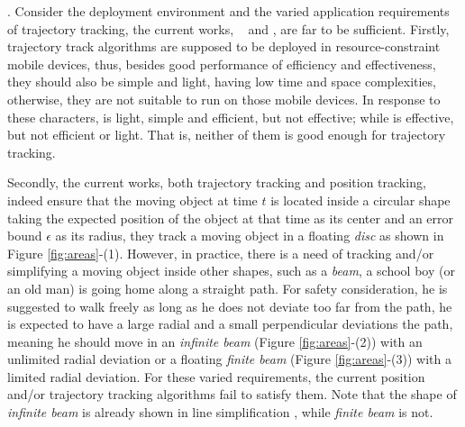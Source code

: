 . Consider the deployment environment and the varied application requirements of trajectory tracking, the current works, \ie~\ldrh \cite{Trajcevski:LDRH} and \grts \cite{Lange:GRTS,Lange:Tracking}, are far to be sufficient. Firstly, trajectory track algorithms are supposed to be deployed in resource-constraint mobile devices, thus, besides good performance of efficiency and effectiveness, they should also be simple and light, \ie having low time and space complexities, otherwise, they are not suitable to run on those mobile devices. In response to these characters, \ldrh is light, simple and efficient, but not effective; while \grts is effective, but not efficient or light. That is, neither of them is good enough for trajectory tracking.

Secondly, the current works, both trajectory tracking and position tracking, indeed ensure that the moving object at time $t$ is located inside a circular shape taking the expected position of the object at that time as its center and an error bound $\epsilon$ as its radius, \ie they track a moving object in a floating \emph{disc} as shown in Figure \ref{fig:areas}-(1). 
%
However, in practice, there is a need of tracking and/or simplifying a moving object inside other shapes, such as a \emph{beam}, \eg a school boy (or an old man) is going home along a straight path. For safety consideration, he is suggested to walk freely as long as he does not deviate too far from the path, \ie he is expected to have a large radial and a small perpendicular deviations \wrt the path, meaning he should move in an \emph{infinite beam} \cite{Chen:Space,Daescu:metric} (Figure \ref{fig:areas}-(2)) with an unlimited radial deviation or a floating \emph{finite beam} (Figure \ref{fig:areas}-(3)) with a limited radial deviation.
%
For these varied requirements, the current position and/or trajectory tracking algorithms fail to satisfy them. Note that the shape of \emph{infinite beam} is already shown in line simplification \cite{Chen:Space,Daescu:metric}, while \emph{finite beam} is not.


